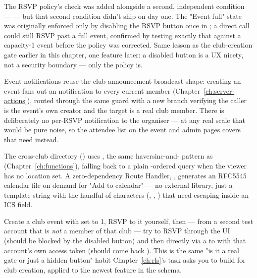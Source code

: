 \begin{olkgotcha}
The RSVP  policy's  check was added alongside a second, independent condition —  — but that second condition didn't ship on day one. The "Event full" state was originally enforced only by disabling the RSVP button once  in ; a direct  call could still RSVP past a full event, confirmed by testing exactly that against a capacity-1 event before the policy was corrected. Same lesson as the club-creation gate earlier in this chapter, one feature later: a disabled button is a UX nicety, not a security boundary — only the policy is.
\end{olkgotcha}

Event notifications reuse the club-announcement broadcast shape: creating an event fans out an  notification to every current member (Chapter~\ref{ch:server-actions}), routed through the same  guard with a new branch verifying the caller is the event's own creator and the target is a real club member. There is deliberately no per-RSVP notification to the organiser — at any real scale that would be pure noise, so the attendee list on the event and admin pages covers that need instead.

The cross-club directory () uses , the same haversine-and- pattern as  (Chapter~\ref{ch:functions}), falling back to a plain -ordered query when the viewer has no location set. A zero-dependency Route Handler, , generates an RFC5545 calendar file on demand for "Add to calendar" — no external library, just a template string with the handful of characters (\code{,}, \code{;}, \code{\textbackslash}) that need escaping inside an ICS field.

\begin{olktask}
Create a club event with  set to 1, RSVP to it yourself, then — from a second test account that is \emph{not} a member of that club — try to RSVP through the UI (should be blocked by the disabled button) and then directly via a  to  with that account's own access token (should come back ). This is the same "is it a real gate or just a hidden button" habit Chapter~\ref{ch:rls}'s task asks you to build for club creation, applied to the newest feature in the schema.
\end{olktask}
